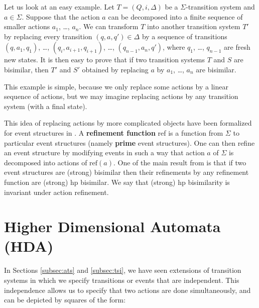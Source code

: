 Let us look at an easy example. Let $T = (Q,i,\Delta)$ be a $\Sigma$-transition system and $a \in \Sigma$. Suppose that the action $a$ can be decomposed into a finite sequence of smaller actions $a_1$, \ldots, $a_n$. We can transform $T$ into another transition system $T'$ by replacing every transition $(q,a,q') \in \Delta$ by a sequence of transitions $(q,a_1,q_1)$, \ldots, $(q_i, a_{i+1},q_{i+1})$, \ldots, $(q_{n-1}, a_n, q')$, where $q_1$, \ldots, $q_{n-1}$ are fresh new states. It is then easy to prove that if two transition systems $T$ and $S$ are bisimilar, then $T'$ and $S'$ obtained by replacing $a$ by $a_1$, \ldots, $a_n$ are bisimilar.

This example is simple, because we only replace some actions by a linear sequence of actions, but we may imagine replacing actions by any transition system (with a final state).

This idea of replacing actions by more complicated objects have been formalized for event structures in \cite{vanglabbeek01}. A \textbf{refinement function} ref is a function from $\Sigma$ to particular event structures (namely \textbf{prime} event structures). One can then refine an event structure by modifying events in such a way that action $a$ of $\Sigma$ is decomposed into actions of $\text{ref}(a)$. One of the main result from \cite{vanglabbeek01} is that if two event structures are (strong) bisimilar then their refinements by any refinement function are (strong) hp bisimilar. We say that (strong) hp bisimilarity is invariant under action refinement.





\section{Higher Dimensional Automata (HDA)}
\label{sec:hda}

In Sections \ref{subsec:ats} and \ref{subsec:tsi}, we have seen extensions of transition systems in which we specify transitions or events that are independent. This independence allows us to specify that two actions are done simultaneously, and can be depicted by squares of the form:
	
				\begin{figure}[H]
					\begin{center}
    						
  					\end{center}
				\end{figure}
				
